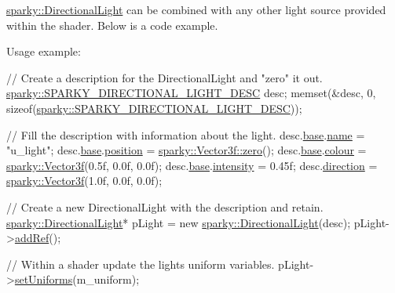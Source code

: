 \hyperlink{classsparky_1_1_directional_light}{sparky\+::\+Directional\+Light} can be combined with any other light source provided within the shader. Below is a code example.

Usage example\+: 
\begin{DoxyCode}
\textcolor{comment}{// Create a description for the DirectionalLight and "zero" it out.}
\hyperlink{structsparky_1_1_s_p_a_r_k_y___d_i_r_e_c_t_i_o_n_a_l___l_i_g_h_t___d_e_s_c}{sparky::SPARKY\_DIRECTIONAL\_LIGHT\_DESC} desc;
memset(&desc, 0, \textcolor{keyword}{sizeof}(\hyperlink{structsparky_1_1_s_p_a_r_k_y___d_i_r_e_c_t_i_o_n_a_l___l_i_g_h_t___d_e_s_c}{sparky::SPARKY\_DIRECTIONAL\_LIGHT\_DESC}));

\textcolor{comment}{// Fill the description with information about the light.}
desc.\hyperlink{structsparky_1_1_s_p_a_r_k_y___d_i_r_e_c_t_i_o_n_a_l___l_i_g_h_t___d_e_s_c_aebc9eb0e44711825e19e79dac4e441f5}{base}.\hyperlink{structsparky_1_1_s_p_a_r_k_y___b_a_s_e___l_i_g_h_t___d_e_s_c_a0b3e29108f714a6004fca8e4a1d6cf67}{name}      = \textcolor{stringliteral}{"u\_light"};                        
desc.\hyperlink{structsparky_1_1_s_p_a_r_k_y___d_i_r_e_c_t_i_o_n_a_l___l_i_g_h_t___d_e_s_c_aebc9eb0e44711825e19e79dac4e441f5}{base}.\hyperlink{structsparky_1_1_s_p_a_r_k_y___b_a_s_e___l_i_g_h_t___d_e_s_c_aed72b3ed8f00100cee86d32063909a48}{position}  = \hyperlink{classsparky_1_1_vector3_accf83dce35ce0cd7aeeb865fe3e9e7a9}{sparky::Vector3f::zero}();         
desc.\hyperlink{structsparky_1_1_s_p_a_r_k_y___d_i_r_e_c_t_i_o_n_a_l___l_i_g_h_t___d_e_s_c_aebc9eb0e44711825e19e79dac4e441f5}{base}.\hyperlink{structsparky_1_1_s_p_a_r_k_y___b_a_s_e___l_i_g_h_t___d_e_s_c_a87e733aa6c7f8cecf430e5d09f424035}{colour}    = \hyperlink{classsparky_1_1_vector3}{sparky::Vector3f}(0.5f, 0.0f, 0.0f);   
desc.\hyperlink{structsparky_1_1_s_p_a_r_k_y___d_i_r_e_c_t_i_o_n_a_l___l_i_g_h_t___d_e_s_c_aebc9eb0e44711825e19e79dac4e441f5}{base}.\hyperlink{structsparky_1_1_s_p_a_r_k_y___b_a_s_e___l_i_g_h_t___d_e_s_c_a3e2f83fe7f13727f235e957debb54634}{intensity} = 0.45f;                    
desc.\hyperlink{structsparky_1_1_s_p_a_r_k_y___d_i_r_e_c_t_i_o_n_a_l___l_i_g_h_t___d_e_s_c_a56dbeae925c825847b305d04ab7fb8e2}{direction}      = \hyperlink{classsparky_1_1_vector3}{sparky::Vector3f}(1.0f, 0.0f, 0.0f);

\textcolor{comment}{// Create a new DirectionalLight with the description and retain.}
\hyperlink{classsparky_1_1_directional_light}{sparky::DirectionalLight}* pLight = \textcolor{keyword}{new} 
      \hyperlink{classsparky_1_1_directional_light}{sparky::DirectionalLight}(desc);
pLight->\hyperlink{classsparky_1_1_ref_aeeb606836c315aa3b8a2254e23eb0899}{addRef}();

\textcolor{comment}{// Within a shader update the lights uniform variables.}
pLight->\hyperlink{classsparky_1_1_directional_light_abe0681b7aa12ee22ff3630302bff9e91}{setUniforms}(m\_uniform);
\end{DoxyCode}
 

